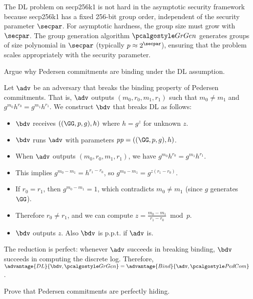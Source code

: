 \ifsolutions
\begin{mysolution}
  The DL problem on secp256k1 is not hard in the asymptotic security framework because secp256k1 has a fixed 256-bit group order, independent of the security parameter $\secpar$.
  For asymptotic hardness, the group size must grow with $\secpar$.
  The group generation algorithm $\grgen$ generates groups of size polynomial in $\secpar$ (typically $p \approx 2^\secpar$), ensuring that the problem scales appropriately with the security parameter.
\end{mysolution}
\fi

\begin{exercise}
  Argue why Pedersen commitments are binding under the DL assumption.
\end{exercise}

\ifsolutions
\begin{mysolution}
  Let $\adv$ be an adversary that breaks the binding property of Pedersen commitments.
  That is, $\adv$ outputs $(m_0, r_0, m_1, r_1)$ such that $m_0 \neq m_1$ and $g^{m_0}h^{r_0} = g^{m_1}h^{r_1}$.
  We construct $\bdv$ that breaks DL as follows:
  \begin{itemize}
    \item $\bdv$ receives $(\gparam, h)$ where $h = g^z$ for unknown $z$.
    \item $\bdv$ runs $\adv$ with parameters $\params = (\gparam, h)$.
    \item When $\adv$ outputs $(m_0, r_0, m_1, r_1)$, we have $g^{m_0}h^{r_0} = g^{m_1}h^{r_1}$.
    \item This implies $g^{m_0 - m_1} = h^{r_1 - r_0}$, so $g^{m_0 - m_1} = g^{z(r_1 - r_0)}$.
    \item If $r_0 = r_1$, then $g^{m_0 - m_1} = 1$, which contradicts $m_0 \neq m_1$ (since $g$ generates $\GG$).
    \item Therefore $r_0 \neq r_1$, and we can compute $z = \frac{m_0 - m_1}{r_1 - r_0} \bmod p$.
    \item $\bdv$ outputs $z$. Also $\bdv$ is p.p.t. if $\adv$ is.
  \end{itemize}
  The reduction is perfect: whenever $\adv$ succeeds in breaking binding, $\bdv$ succeeds in computing the discrete log.
  Therefore, $\advantage{DL}{\bdv, \grgen} = \advantage{Bind}{\adv, \algo{PedCom}}$.
\end{mysolution}
\fi

\begin{exercise}
  Prove that Pedersen commitments are perfectly hiding.
\end{exercise}

